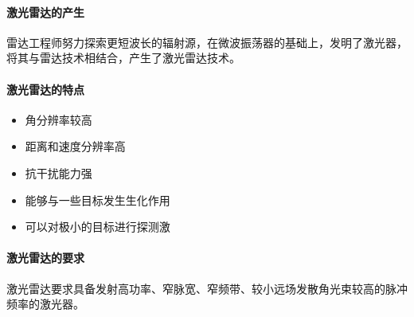 \paragraph{激光雷达的产生}雷达工程师努力探索更短波长的辐射源，在微波振荡器的基础上，发明了激光器，将其与雷达技术相结合，产生了激光雷达技术。

\paragraph{激光雷达的特点}
\begin{itemize}
	\item 角分辨率较高
	\item 距离和速度分辨率高
	\item 抗干扰能力强
	\item 能够与一些目标发生生化作用
	\item 可以对极小的目标进行探测激
\end{itemize}

\paragraph{激光雷达的要求} 激光雷达要求具备发射高功率、窄脉宽、窄频带、较小远场发散角光束较高的脉冲频率的激光器。

